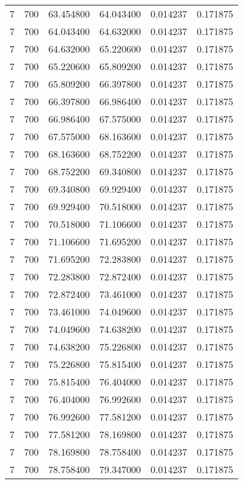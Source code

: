 \begin{longtable}{rrrrrr}
7 & 700 & 63.454800 & 64.043400 & 0.014237 & 0.171875 \\
7 & 700 & 64.043400 & 64.632000 & 0.014237 & 0.171875 \\
7 & 700 & 64.632000 & 65.220600 & 0.014237 & 0.171875 \\
7 & 700 & 65.220600 & 65.809200 & 0.014237 & 0.171875 \\
7 & 700 & 65.809200 & 66.397800 & 0.014237 & 0.171875 \\
7 & 700 & 66.397800 & 66.986400 & 0.014237 & 0.171875 \\
7 & 700 & 66.986400 & 67.575000 & 0.014237 & 0.171875 \\
7 & 700 & 67.575000 & 68.163600 & 0.014237 & 0.171875 \\
7 & 700 & 68.163600 & 68.752200 & 0.014237 & 0.171875 \\
7 & 700 & 68.752200 & 69.340800 & 0.014237 & 0.171875 \\
7 & 700 & 69.340800 & 69.929400 & 0.014237 & 0.171875 \\
7 & 700 & 69.929400 & 70.518000 & 0.014237 & 0.171875 \\
7 & 700 & 70.518000 & 71.106600 & 0.014237 & 0.171875 \\
7 & 700 & 71.106600 & 71.695200 & 0.014237 & 0.171875 \\
7 & 700 & 71.695200 & 72.283800 & 0.014237 & 0.171875 \\
7 & 700 & 72.283800 & 72.872400 & 0.014237 & 0.171875 \\
7 & 700 & 72.872400 & 73.461000 & 0.014237 & 0.171875 \\
7 & 700 & 73.461000 & 74.049600 & 0.014237 & 0.171875 \\
7 & 700 & 74.049600 & 74.638200 & 0.014237 & 0.171875 \\
7 & 700 & 74.638200 & 75.226800 & 0.014237 & 0.171875 \\
7 & 700 & 75.226800 & 75.815400 & 0.014237 & 0.171875 \\
7 & 700 & 75.815400 & 76.404000 & 0.014237 & 0.171875 \\
7 & 700 & 76.404000 & 76.992600 & 0.014237 & 0.171875 \\
7 & 700 & 76.992600 & 77.581200 & 0.014237 & 0.171875 \\
7 & 700 & 77.581200 & 78.169800 & 0.014237 & 0.171875 \\
7 & 700 & 78.169800 & 78.758400 & 0.014237 & 0.171875 \\
7 & 700 & 78.758400 & 79.347000 & 0.014237 & 0.171875 \\

\end{longtable}

